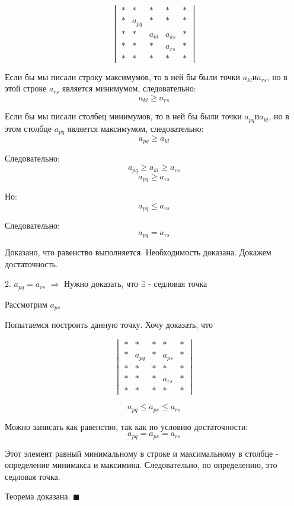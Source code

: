 \documentclass[aps,%
12pt,%
final,%
oneside,
onecolumn,%
musixtex, %
superscriptaddress,%
centertags]{article} %
\begin{document}
$$\begin{vmatrix}
	
 *  & * &  * &  *  & * \\ 
 * &a_{pq} & *  & *  & * \\ 
 *  & *  & a_{kl} &  a_{ks} &  * \\ 
 * & *  &  * & a_{rs} &* \\ 
 * & *  &  *  &   *    &  * 

\end{vmatrix}$$

Если бы мы писали строку максимумов, то в ней бы были точки $a_{kl} и a_{rs}$, но в этой строке $a_{rs}$ является минимумом, следовательно: $$ a_{kl} \geq a_{rs} $$

Если бы мы писали столбец минимумов, то в ней бы были точки $a_{pq} и a_{kl}$, но в этом столбце $a_{pq}$ является максимумом, следовательно: 
$$ a_{pq} \geq a_{kl}$$

Следовательно:
$$ a_{pq} \geq a_{kl} \geq a_{rs} $$
$$ a_{pq} \geq a_{rs} $$

Но:
$$ a_{pq} \leq a_{rs} $$

Следовательно:
$$ a_{pq} = a_{rs} $$

Доказано, что равенство выполняется. Необходимость доказана. Докажем достаточность.

2. $a_{pq} = a_{rs}$  $\Rightarrow $ Нужно доказать, что $\exists$ - седловая точка 

Рассмотрим $a_{ps}$

Попытаемся построить данную точку. Хочу доказать, что 

$$\begin{vmatrix}
	
 *  & * &  * &  *  & * \\ 
 * &a_{pq} & *  & a_{ps}  & * \\ 
 *  & *  & * &  * &  * \\ 
 * & *  &  * & a_{rs} &* \\ 
 * & *  &  *  &   *    &  * 

\end{vmatrix}$$

$$ a_{pq} \leq a_{ps} \leq a_{rs}$$

Можно записать как равенство, так как по условию достаточности:
$$ a_{pq} = a_{ps} = a_{rs}$$

Этот элемент равный минимальному в строке и максимальному в столбце - определение минимакса и максимина. Следовательно, по определению, это седловая точка.

Теорема доказана. $\blacksquare$
\end{document}
